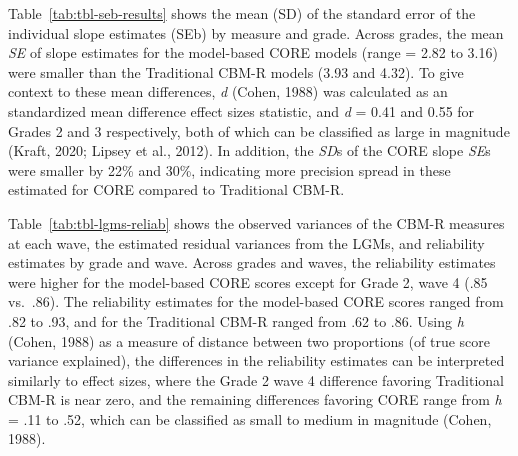 \documentclass[
  english,
  man, fleqn, noextraspace]{apa6}
\begin{document}
Table~\ref{tab:tbl-seb-results} shows the mean (SD) of the standard error of the individual slope estimates (SEb) by measure and grade. Across grades, the mean \emph{SE} of slope estimates for the model-based CORE models (range = 2.82 to 3.16) were smaller than the Traditional CBM-R models (3.93 and 4.32). To give context to these mean differences, \emph{d} (Cohen, 1988) was calculated as an standardized mean difference effect sizes statistic, and \emph{d} = 0.41 and 0.55 for Grades 2 and 3 respectively, both of which can be classified as large in magnitude (Kraft, 2020; Lipsey et al., 2012). In addition, the \emph{SD}s of the CORE slope \emph{SE}s were smaller by 22\% and 30\%, indicating more precision spread in these estimated for CORE compared to Traditional CBM-R.

Table~\ref{tab:tbl-lgms-reliab} shows the observed variances of the CBM-R measures at each wave, the estimated residual variances from the LGMs, and reliability estimates by grade and wave. Across grades and waves, the reliability estimates were higher for the model-based CORE scores except for Grade 2, wave 4 (.85 vs.~.86). The reliability estimates for the model-based CORE scores ranged from .82 to .93, and for the Traditional CBM-R ranged from .62 to .86. Using \emph{h} (Cohen, 1988) as a measure of distance between two proportions (of true score variance explained), the differences in the reliability estimates can be interpreted similarly to effect sizes, where the Grade 2 wave 4 difference favoring Traditional CBM-R is near zero, and the remaining differences favoring CORE range from \emph{h} = .11 to .52, which can be classified as small to medium in magnitude (Cohen, 1988).
\end{document}
